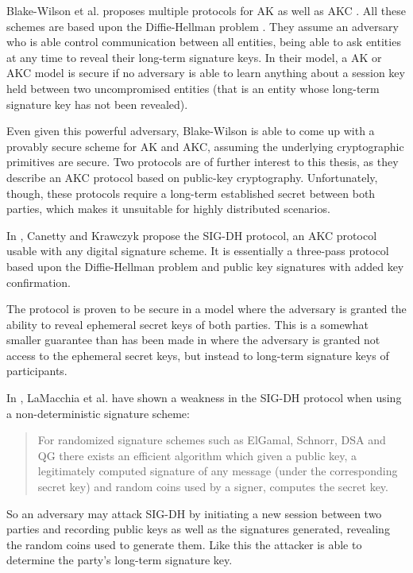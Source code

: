 Blake-Wilson et al. proposes multiple protocols for AK as well as AKC \cite{blake1997key}.
All these schemes are based upon the Diffie-Hellman problem \cite{diffie1976new}.
They assume an adversary who is able control communication between all entities, being able to ask entities at any time to reveal their long-term signature keys.
In their model, a AK or AKC model is secure if no adversary is able to learn anything about a session key held between two uncompromised entities (that is an entity whose long-term signature key has not been revealed).

Even given this powerful adversary, Blake-Wilson is able to come up with a provably secure scheme for AK and AKC, assuming the underlying cryptographic primitives are secure.
Two protocols are of further interest to this thesis, as they describe an AKC protocol based on public-key cryptography.
Unfortunately, though, these protocols require a long-term established secret between both parties, which makes it unsuitable for highly distributed scenarios.

In \cite{canetti2001analysis}, Canetty and Krawczyk propose the SIG-DH protocol, an AKC protocol usable with any digital signature scheme.
It is essentially a three-pass protocol based upon the Diffie-Hellman problem and public key signatures with added key confirmation.

The protocol is proven to be secure in a model where the adversary is granted the ability to reveal ephemeral secret keys of both parties.
This is a somewhat smaller guarantee than has been made in \cite{blake1997key} where the adversary is granted not access to the ephemeral secret keys, but instead to long-term signature keys of participants.

In \cite{lamacchia2007stronger}, LaMacchia et al. have shown a weakness in the SIG-DH protocol when using a non-deterministic signature scheme:
\begin{quote}
    For randomized signature schemes such as ElGamal, Schnorr, DSA and QG there exists an efficient algorithm which given a public key, a legitimately computed signature of any message (under the corresponding secret key) and random coins used by a signer, computes the secret key.
\end{quote}
So an adversary may attack SIG-DH by initiating a new session between two parties and recording public keys as well as the signatures generated, revealing the random coins used to generate them.
Like this the attacker is able to determine the party's long-term signature key.

